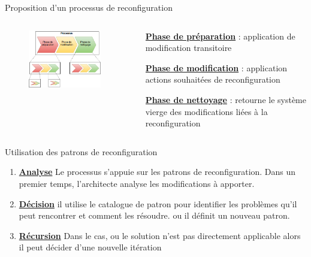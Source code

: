 \begin{frame}{Proposition d'un processus de reconfiguration}
\begin{columns}
\begin{column}{0.6\textwidth}
\begin{figure}
\centering
\includegraphics[width=0.9\textwidth]{imgs/phases-de-reconfiguration.jpg}
\end{figure}
\end{column}
\begin{column}{0.4\textwidth}
\begin{block}{}
\underline{\textbf{Phase de préparation}} : application de modification transitoire
\end{block}
\begin{block}{}
\underline{\textbf{Phase de modification}} : application actions souhaitées de reconfiguration
\end{block}
\begin{block}{}
\underline{\textbf{Phase de nettoyage}} : retourne le système vierge des modifications
liées à la reconfiguration
\end{block}
\end{column}
\end{columns}
\end{frame}

\begin{frame}{Utilisation des patrons de reconfiguration}
\begin{enumerate}
\item \underline{\textbf{Analyse}} Le processus s'appuie sur les patrons de reconfiguration. Dans un
premier temps, l'architecte analyse les modifications à apporter.
\item \underline{\textbf{Décision}}  il utilise le catalogue de patron pour identifier les problèmes qu'il
peut rencontrer et comment les résoudre. ou il définit un nouveau
patron.
\item \underline{\textbf{Récursion}} Dans le cas, ou le solution n'est pas directement applicable alors il
peut décider d'une nouvelle itération
\end{enumerate}
\end{frame}

